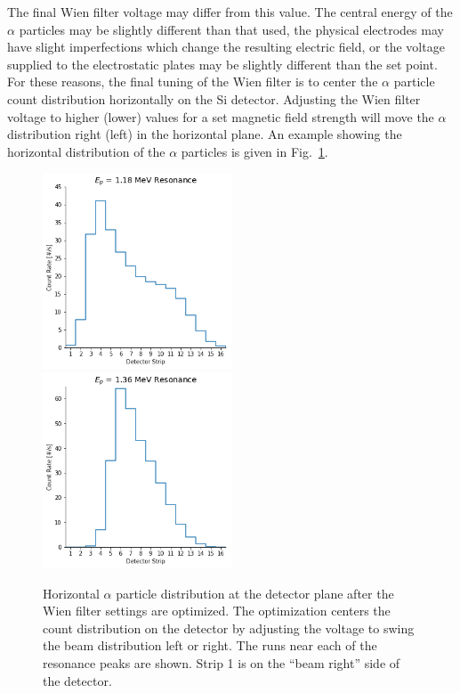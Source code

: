 The final Wien filter voltage may differ from this value. The central
energy of the $\alpha$ particles may be slightly different than that
used, the physical electrodes may have slight imperfections which change
the resulting electric field, or the voltage supplied to the
electrostatic plates may be slightly different than the set point. For
these reasons, the final tuning of the Wien filter is to center the
$\alpha$ particle count distribution horizontally on the Si detector.
Adjusting the Wien filter voltage to higher (lower) values for a set
magnetic field strength will move the $\alpha$ distribution right (left)
in the horizontal plane. An example showing the horizontal
distribution of the $\alpha$ particles is given in
Fig.~\ref{fig:alpha-distribution-strips}.

\begin{figure}
    \begin{center}
        \centerline{
            \includegraphics[width=0.5\textwidth]{figures/low_resonance_detector_strips.png}
            \includegraphics[width=0.5\textwidth]{figures/high_resonance_detector_strips.png}
        }
        \caption[Horizontal $\alpha$ particle distribution]{Horizontal
            $\alpha$ particle distribution at the detector plane after
            the Wien filter settings are optimized. The optimization
            centers the count distribution on the detector by adjusting
            the voltage to swing the beam distribution left or right.
            The runs near each of the resonance peaks are shown. Strip 1
            is on the ``beam right'' side of the detector.}
        \label{fig:alpha-distribution-strips}
    \end{center}
\end{figure}

